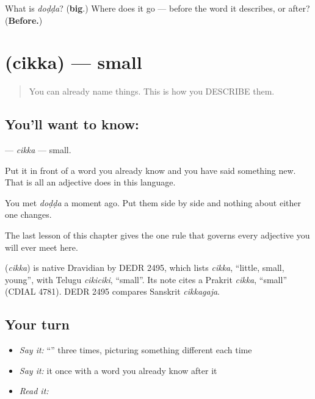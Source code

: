 \begin{tcolorbox}[breakable,colback=teal!4,colframe=teal!35!black,title={Before you move on}]
What is \emph{doḍḍa}? (\textbf{big}.) Where does it go — before the word it describes, or after? (\textbf{Before.})
\end{tcolorbox}
\section[\texorpdfstring{\kn{ಚಿಕ್ಕ} (cikka)}{ಚಿಕ್ಕ (cikka)}]{ (cikka) — small}

\label{lesson:KA-C42-small}



\begin{quote}
You can already name things. This is how you DESCRIBE them.
\end{quote}

\subsection*{You'll want to know: }
\textbf{} — \emph{cikka} — small.

Put it in front of a word you already know and you have said something new. That is all an adjective does in this language.

You met \textbf{} \emph{doḍḍa} a moment ago. Put them side by side and nothing about either one changes.

The last lesson of this chapter gives the one rule that governs every adjective you will ever meet here.

\begin{cousinweb}
\textbf{} (\emph{cikka}) is native Dravidian by DEDR 2495, which lists \emph{cikka}, \textquotedblleft{}little, small, young\textquotedblright{}, with Telugu \emph{cikiciki}, \textquotedblleft{}small\textquotedblright{}. Its note cites a Prakrit \emph{cikka}, \textquotedblleft{}small\textquotedblright{} (CDIAL 4781). DEDR 2495 compares Sanskrit \emph{cikkagaja}.
\end{cousinweb}

\subsection*{Your turn}
\begin{itemize}
\raggedright
  \item \emph{Say it:} \textquotedblleft{}\textquotedblright{} three times, picturing something different each time
  \item \emph{Say it:} it once with a word you already know after it
  \item \emph{Read it:} \textbf{}
\end{itemize}

